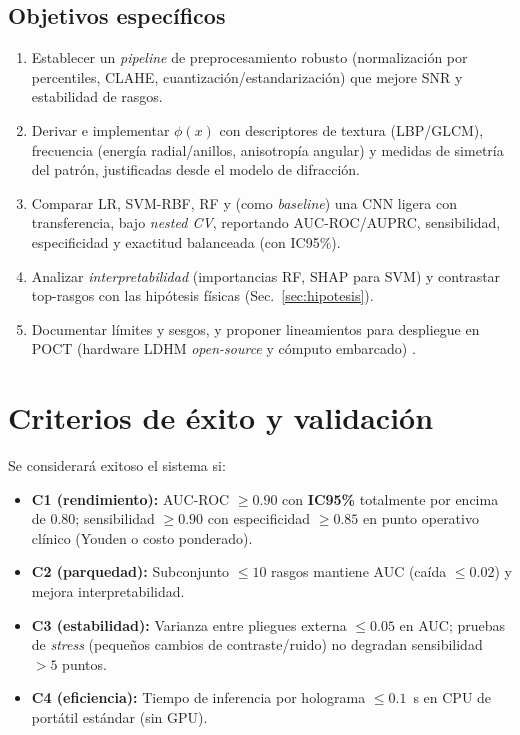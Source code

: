 \subsection{Objetivos específicos}
\begin{enumerate}
\item Establecer un \emph{pipeline} de preprocesamiento robusto (normalización por percentiles, CLAHE, cuantización/estandarización) que mejore SNR y estabilidad de rasgos.
\item Derivar e implementar $\phi(x)$ con descriptores de textura (LBP/GLCM), frecuencia (energía radial/anillos, anisotropía angular) y medidas de simetría del patrón, justificadas desde el modelo de difracción.
\item Comparar LR, SVM-RBF, RF y (como \emph{baseline}) una CNN ligera con transferencia, bajo \emph{nested CV}, reportando AUC-ROC/AUPRC, sensibilidad, especificidad y exactitud balanceada (con IC95\%).
\item Analizar \emph{interpretabilidad} (importancias RF, SHAP para SVM) y contrastar top-rasgos con las hipótesis físicas (Sec.~\ref{sec:hipotesis}).
\item Documentar límites y sesgos, y proponer lineamientos para despliegue en POCT (hardware LDHM \emph{open-source} y cómputo embarcado) \cite{Amann2019SciRep,BuitragoDuque2023HardwareX}.
\end{enumerate}

\section{Criterios de éxito y validación}
Se considerará exitoso el sistema si:
\begin{itemize}
\item \textbf{C1 (rendimiento):} AUC-ROC $\ge 0.90$ con \textbf{IC95\%} totalmente por encima de 0.80; sensibilidad $\ge 0.90$ con especificidad $\ge 0.85$ en punto operativo clínico (Youden o costo ponderado).
\item \textbf{C2 (parquedad):} Subconjunto $\le 10$ rasgos mantiene AUC (caída $\le 0.02$) y mejora interpretabilidad.
\item \textbf{C3 (estabilidad):} Varianza entre pliegues externa $\le 0.05$ en AUC; pruebas de \emph{stress} (pequeños cambios de contraste/ruido) no degradan sensibilidad $> 5$ puntos.
\item \textbf{C4 (eficiencia):} Tiempo de inferencia por holograma $\le 0.1$~s en CPU de portátil estándar (sin GPU).
\end{itemize}

